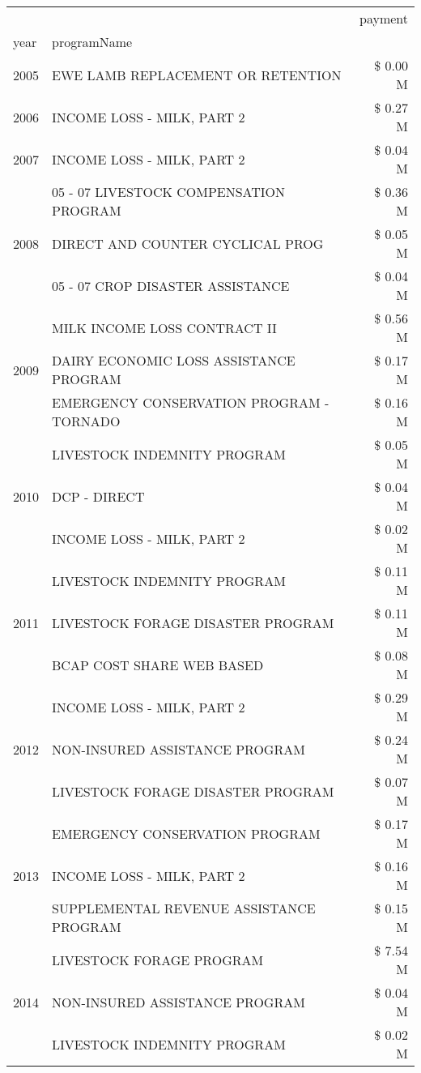 \begin{tabular}{llr}
\toprule
 &  & payment \\
year & programName &  \\
\midrule
2005 & EWE LAMB REPLACEMENT OR RETENTION & \$ 0.00 M \\
\cline{1-3}
2006 & INCOME LOSS - MILK, PART 2 & \$ 0.27 M \\
\cline{1-3}
2007 & INCOME LOSS - MILK, PART 2 & \$ 0.04 M \\
\cline{1-3}
\multirow[t]{3}{*}{2008} & 05 - 07 LIVESTOCK COMPENSATION PROGRAM & \$ 0.36 M \\
 & DIRECT AND COUNTER CYCLICAL PROG & \$ 0.05 M \\
 & 05 - 07 CROP DISASTER ASSISTANCE & \$ 0.04 M \\
\cline{1-3}
\multirow[t]{3}{*}{2009} & MILK INCOME LOSS CONTRACT II & \$ 0.56 M \\
 & DAIRY ECONOMIC LOSS ASSISTANCE PROGRAM & \$ 0.17 M \\
 & EMERGENCY CONSERVATION PROGRAM - TORNADO & \$ 0.16 M \\
\cline{1-3}
\multirow[t]{3}{*}{2010} & LIVESTOCK INDEMNITY PROGRAM & \$ 0.05 M \\
 & DCP - DIRECT & \$ 0.04 M \\
 & INCOME LOSS - MILK, PART 2 & \$ 0.02 M \\
\cline{1-3}
\multirow[t]{3}{*}{2011} & LIVESTOCK INDEMNITY PROGRAM & \$ 0.11 M \\
 & LIVESTOCK FORAGE DISASTER PROGRAM & \$ 0.11 M \\
 & BCAP COST SHARE WEB BASED & \$ 0.08 M \\
\cline{1-3}
\multirow[t]{3}{*}{2012} & INCOME LOSS - MILK, PART 2 & \$ 0.29 M \\
 & NON-INSURED ASSISTANCE PROGRAM & \$ 0.24 M \\
 & LIVESTOCK FORAGE DISASTER PROGRAM & \$ 0.07 M \\
\cline{1-3}
\multirow[t]{3}{*}{2013} & EMERGENCY CONSERVATION PROGRAM & \$ 0.17 M \\
 & INCOME LOSS - MILK, PART 2 & \$ 0.16 M \\
 & SUPPLEMENTAL REVENUE ASSISTANCE PROGRAM & \$ 0.15 M \\
\cline{1-3}
\multirow[t]{3}{*}{2014} & LIVESTOCK FORAGE PROGRAM & \$ 7.54 M \\
 & NON-INSURED ASSISTANCE PROGRAM & \$ 0.04 M \\
 & LIVESTOCK INDEMNITY PROGRAM & \$ 0.02 M \\

\end{tabular}
